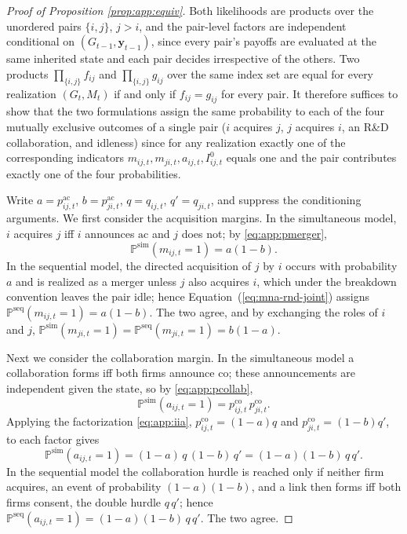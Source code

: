 \begin{proof}[Proof of Proposition \ref{prop:app:equiv}]
Both likelihoods are products over the unordered pairs $\{i,j\}$, $j>i$,
and the pair-level factors are independent conditional on $(G_{t-1},
\mathbf{y}_{t-1})$, since every pair's payoffs are evaluated at the same
inherited state and each pair decides irrespective of the others. Two
products $\prod_{\{i,j\}} f_{ij}$ and $\prod_{\{i,j\}} g_{ij}$ over the
same index set are equal for every realization $(G_t,M_t)$ if and only
if $f_{ij}=g_{ij}$ for every pair. It therefore suffices to show that
the two formulations assign the same probability to each of the four
mutually exclusive outcomes of a single pair ($i$ acquires $j$, $j$
acquires $i$, an R\&D collaboration, and idleness) since for any
realization exactly one of the corresponding indicators
$m_{ij,t}, m_{ji,t}, a_{ij,t}, I^{0}_{ij,t}$ equals one and the pair
contributes exactly one of the four probabilities.

Write $a=p^{\mathrm{ac}}_{ij,t}$, $b=p^{\mathrm{ac}}_{ji,t}$,
$q=q_{ij,t}$, $q'=q_{ji,t}$, and suppress the conditioning arguments. We first consider the acquisition margins. In the simultaneous model, $i$ acquires $j$
iff $i$ announces $\mathrm{ac}$ and $j$ does not; by \eqref{eq:app:pmerger},
\[
  \mathbb{P}^{\mathrm{sim}}(m_{ij,t}=1) = a(1-b).
\]
In the sequential model, the directed acquisition of $j$ by $i$ occurs
with probability $a$ and is realized as a merger unless $j$ also
acquires $i$, which under the breakdown convention leaves the pair idle;
hence Equation~(\ref{eq:mna-rnd-joint}) assigns
$\mathbb{P}^{\mathrm{seq}}(m_{ij,t}=1)=a(1-b)$. The two agree, and by
exchanging the roles of $i$ and $j$,
$\mathbb{P}^{\mathrm{sim}}(m_{ji,t}=1)=\mathbb{P}^{\mathrm{seq}}(m_{ji,t}=1)
=b(1-a)$.

Next we consider the collaboration margin. In the simultaneous model a collaboration
forms iff both firms announce $\mathrm{co}$; these announcements are
independent given the state, so by \eqref{eq:app:pcollab},
\[
  \mathbb{P}^{\mathrm{sim}}(a_{ij,t}=1)
  = p^{\mathrm{co}}_{ij,t}\, p^{\mathrm{co}}_{ji,t}.
\]
Applying the factorization \eqref{eq:app:iia},
$p^{\mathrm{co}}_{ij,t}=(1-a)q$ and $p^{\mathrm{co}}_{ji,t}=(1-b)q'$, to
each factor gives
\[
  \mathbb{P}^{\mathrm{sim}}(a_{ij,t}=1)
  = (1-a)\,q\,(1-b)\,q'
  = (1-a)(1-b)\,q\,q'.
\]
In the sequential model the collaboration hurdle is reached only if
neither firm acquires, an event of probability $(1-a)(1-b)$, and a link
then forms iff both firms consent, the double hurdle $q\,q'$; hence
$\mathbb{P}^{\mathrm{seq}}(a_{ij,t}=1)=(1-a)(1-b)\,q\,q'$. The two agree.


\end{proof}
